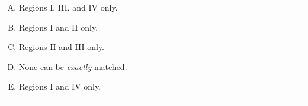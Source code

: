 \documentclass[12pt]{amsart}
\newcommand{\divider}{
  \vspace{-1em} %
  \noindent
  \raisebox{-0.15ex}{\textbullet}%
  \hspace{0.5em}%
  \rule[0.5ex]{0.95\textwidth}{1.0pt}%
  \hspace{0.5em}%
  \raisebox{-0.15ex}{\textbullet}%
  \vspace{0em} %
}
\begin{document}
\begin{enumerate}[(A)]
\item Regions I, III, and IV only.
\item Regions I and II only.
\item Regions II and III only.
\item None can be {\em exactly} matched.
\item Regions I and IV only.
\end{enumerate}
%
%
%
\divider




\end{document}

